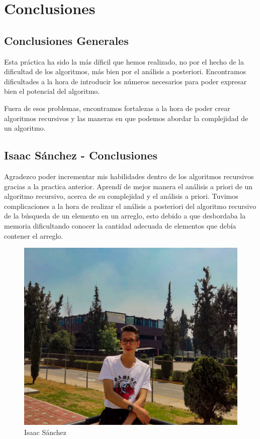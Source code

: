 \chapter{Conclusiones}

\section{Conclusiones Generales}
    
    Esta práctica ha sido la más díficil que hemos realizado, no por el hecho de la dificultad de los algoritmos, más bien por el análisis a posteriori. Encontramos dificultades a la hora de introducir los números necesarios para poder expresar bien el potencial del algoritmo. 
    
    Fuera de esos problemas, encontramos fortalezas a la hora de poder crear algoritmos recursivos y las maneras en que podemos abordar la complejidad de un algoritmo.

\newpage
\section{Isaac Sánchez - Conclusiones}
    Agradezco poder incrementar mis habilidades dentro de los algoritmos recursivos gracias a la practica anterior. Aprendí de mejor manera el análisis a priori de un algoritmo recursivo, acerca de su complejidad y el análisis a priori. Tuvimos complicaciones a la hora de realizar el análisis a posteriori del algoritmo recursivo de la búsqueda de un elemento en un arreglo, esto debido a que desbordaba la memoria dificultando conocer la cantidad adecuada de elementos que debía contener el arreglo.
    \begin{figure}[htp!]
            \centering
            \includegraphics[width=1 \textwidth]{Images/Fotos_Alumnos/274612600_2528992867236334_6677874837890685705_n.jpg}  
            \caption{Isaac Sánchez}
            \label{fig:my_label1}
        \end{figure}
    


